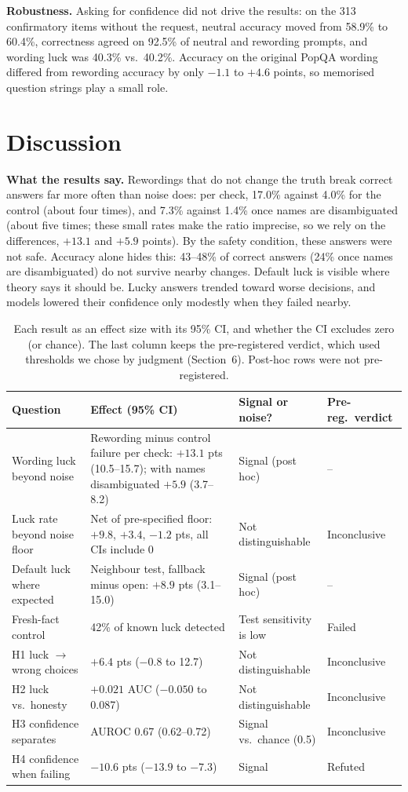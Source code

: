 \documentclass[10pt]{article}
\begin{document}
\textbf{Robustness.} Asking for confidence did not drive the results: on the 313 confirmatory items without the request, neutral accuracy moved from 58.9\% to 60.4\%, correctness agreed on 92.5\% of neutral and rewording prompts, and wording luck was 40.3\% vs.\ 40.2\%. Accuracy on the original PopQA wording differed from rewording accuracy by only $-1.1$ to $+4.6$ points, so memorised question strings play a small role.

\section{Discussion}
\textbf{What the results say.} Rewordings that do not change the truth break correct answers far more often than noise does: per check, 17.0\% against 4.0\% for the control (about four times), and 7.3\% against 1.4\% once names are disambiguated (about five times; these small rates make the ratio imprecise, so we rely on the differences, $+13.1$ and $+5.9$ points). By the safety condition, these answers were not safe. Accuracy alone hides this: 43--48\% of correct answers (24\% once names are disambiguated) do not survive nearby changes. Default luck is visible where theory says it should be. Lucky answers trended toward worse decisions, and models lowered their confidence only modestly when they failed nearby.

\begin{table}[t]
\centering\small
\begin{tabularx}{\linewidth}{@{}l Y l l@{}}
\toprule
Question & Effect (95\% CI) & Signal or noise? & Pre-reg.\ verdict \\
\midrule
Wording luck beyond noise & Rewording minus control failure per check: $+13.1$ pts (10.5--15.7); with names disambiguated $+5.9$ (3.7--8.2) & Signal (post hoc) & -- \\
Luck rate beyond noise floor & Net of pre-specified floor: $+9.8$, $+3.4$, $-1.2$ pts, all CIs include 0 & Not distinguishable & Inconclusive \\
Default luck where expected & Neighbour test, fallback minus open: $+8.9$ pts (3.1--15.0) & Signal (post hoc) & -- \\
Fresh-fact control & 42\% of known luck detected & Test sensitivity is low & Failed \\
H1 luck $\to$ wrong choices & $+6.4$ pts ($-0.8$ to 12.7) & Not distinguishable & Inconclusive \\
H2 luck vs.\ honesty & $+0.021$ AUC ($-0.050$ to 0.087) & Not distinguishable & Inconclusive \\
H3 confidence separates & AUROC 0.67 (0.62--0.72) & Signal vs.\ chance (0.5) & Inconclusive \\
H4 confidence when failing & $-10.6$ pts ($-13.9$ to $-7.3$) & Signal & Refuted \\
\bottomrule
\end{tabularx}
\caption{Each result as an effect size with its 95\% CI, and whether the CI excludes zero (or chance). The last column keeps the pre-registered verdict, which used thresholds we chose by judgment (Section~6). Post-hoc rows were not pre-registered.}
\label{tab:evidence}
\end{table}
\end{document}
